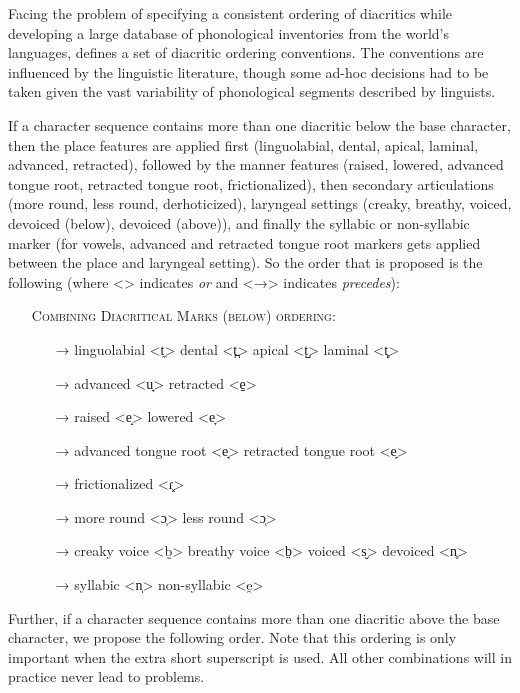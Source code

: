 Facing the problem of specifying a consistent ordering of diacritics while
developing a large database of phonological inventories from the world's
languages, \citet[540]{Moran2012} defines a set of diacritic ordering
conventions. The conventions are influenced by the linguistic literature, though
some ad-hoc decisions had to be taken given the vast variability of phonological segments 
described by linguists. 

If a character sequence contains more than one diacritic below the base
character, then the place features are applied first (linguolabial, dental,
apical, laminal, advanced, retracted), followed by the manner features (raised,
lowered, advanced tongue root, retracted tongue root, frictionalized), then
secondary articulations (more round, less round, derhoticized), laryngeal
settings (creaky, breathy, voiced, devoiced (below), devoiced (above)), and
finally the syllabic or non-syllabic marker (for vowels, advanced and retracted
tongue root markers gets applied between the place and laryngeal setting). So
the order that is proposed is the following (where <\textbar{}> indicates
\textit{or} and <→> indicates \textit{precedes}):

\begin{itemize}
	\item[] \textsc{Combining Diacritical Marks (below) ordering:}
	\begin{itemize}	
	  \item[→] linguolabial <t̼> \textbar{} dental <t̪> \textbar{} apical <t̺> \textbar{} laminal <t̻>
	  \item[→] advanced <u̟> \textbar{} retracted <e̠> 
	  \item[→] raised <e̝> \textbar{} lowered <e̞>
	  \item[→] advanced tongue root <e̘> \textbar{} retracted tongue root <e̙>
	  \item[→] frictionalized <ɾ͓>
	  \item[→] more round <ɔ̹> \textbar{} less round <ɔ̜>
	  \item[→] creaky voice <b̰> \textbar{} breathy voice <b̤> \textbar{} voiced <s̬> \textbar{} devoiced <n̥>
	  \item[→] syllabic <n̩> \textbar{} non-syllabic <e̯>
	\end{itemize}
 \end{itemize}

Further, if a character sequence contains more than one diacritic above the base
character, we propose the following order. Note that this ordering is only
important when the extra short superscript is used. All other combinations will 
in practice never lead to problems.

